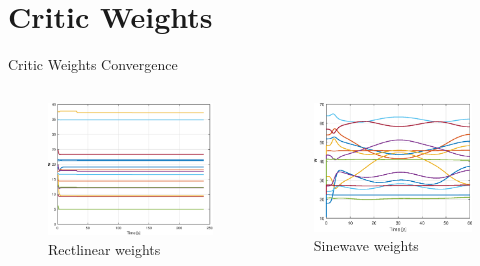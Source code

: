 \documentclass{beamer}
\begin{document}
\section{Critic Weights}
\begin{frame}{Critic Weights Convergence}
\begin{columns}
\begin{column}{0.5\textwidth}
\begin{figure}
\includegraphics[scale=0.35]{figs/matlab/gradientDescent/rectlinear/weightRectilinear.eps}
\caption{Rectlinear weights}
\end{figure}
\end{column}

\begin{column}{0.5\textwidth}
\begin{center}

\begin{figure}
\includegraphics[scale=0.45]{figs/matlab/gradientDescent/sinewave/weightSinewave.eps}
\caption{Sinewave weights}
\end{figure}
\end{center}

\end{column}

\end{columns}
\end{frame}
\end{document}

